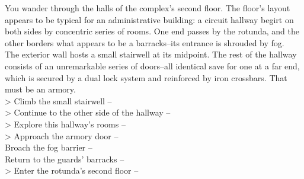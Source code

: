 You wander through the halls of the complex’s second floor. The floor's layout appears to be typical for an administrative building: a circuit hallway begirt on both sides by concentric series of rooms. One end passes by the rotunda, and the other borders what appears to be a barracks--its entrance is shrouded by fog.\\

The exterior wall hosts a small stairwell at its midpoint. The rest of the hallway consists of an unremarkable series of doors--all identical save for one at a far end, which is secured by a dual lock system and reinforced by iron crossbars. That must be an armory.\\

> Climb the small stairwell -- \\
> Continue to the other side of the hallway -- \\
> Explore this hallway's rooms -- \\
> Approach the armory door -- \\
 Broach the fog barrier -- \\
 Return to the guards' barracks -- \\
> Enter the rotunda’s second floor -- 